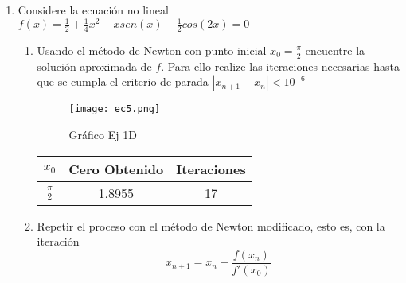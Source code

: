 \documentclass{udpreport}
\begin{document}
\begin{enumerate}
\begin{enumerate}
    \newpage
    
    
    \end{enumerate}
\newpage
\item Considere la ecuación no lineal $f(x)= \frac{1}{2}+\frac{1}{4}x^2-xsen(x)-\frac{1}{2}cos(2x)=0$
    	\begin{enumerate}
    	\item  Usando el método de Newton con punto inicial $x_{0}=\frac{\pi}{2}$ encuentre la solución aproximada de $f$. Para ello realize las iteraciones necesarias hasta que se cumpla el criterio de parada $ |x_{n+1} - x_{n} |< 10^{-6} $
    	\begin{figure}[H]
        \centering
        \texttt{[image: ec5.png]}
        \caption{Gráfico Ej 1D}
        \end{figure}
        	\begin{table} [H]
        			\centering
        			\begin{tabular}{|c|c|c|}
        				\hline
        				$x_{0}$ & Cero Obtenido & Iteraciones\\
        				\hline
        				$\frac{\pi}{2} $ &   1.8955 & 17\\
        				\hline 
        			\end{tabular}
        		\end{table}
        	
        	\item Repetir el proceso con el método de Newton modificado, esto es, con la iteración $$x_{n+1} = x_{n} - \frac {f(x_{n})} {f'(x_{0})} $$
        	

\end{enumerate}
\end{enumerate}
\end{document}
